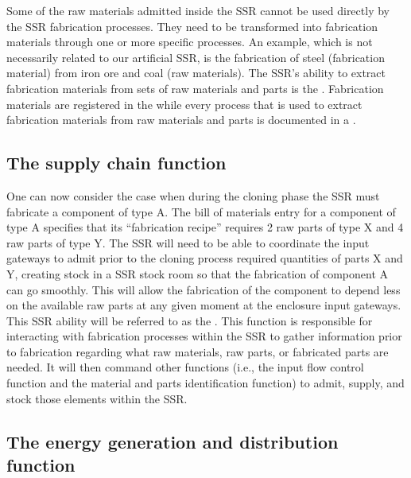 Some of the raw materials
admitted inside the SSR cannot be used directly by the SSR fabrication
processes. They need to be transformed into fabrication materials
through one or more specific processes. An example, which is not necessarily
related to our artificial SSR, is the fabrication
of steel (fabrication material) from iron ore and coal (raw materials). The SSR's ability to
extract fabrication materials from sets of raw materials and parts is
the .  Fabrication
materials are registered in the  
while every process that is used
to extract fabrication materials from raw materials and parts is
documented in a .

\subsection[The supply chain function]{The supply chain function}

One can now consider the case when during the
cloning phase the SSR must fabricate a component of type A.  The bill
of materials entry for a component of type A specifies that its
“fabrication recipe” requires 2 raw parts of type X and 4 raw parts of
type Y.  The SSR will need to be able to coordinate the input
gateways to admit prior to the cloning process required quantities of parts X and Y,
creating stock in a SSR stock room so that the fabrication of
component A can go smoothly.  This will allow the fabrication of the component to depend less 
on the available raw parts at any given moment at the enclosure input
gateways. This SSR ability will be referred to as the . 
This function is responsible for interacting with
fabrication processes within the SSR to gather information prior to
fabrication regarding what raw materials, raw parts, or fabricated
parts are needed. It will then command other functions (i.e., the input flow control function 
and the material and parts identification function) to admit, supply, and stock
those elements within the SSR.

\subsection[The energy generation and distribution function]{The energy generation and distribution function}

